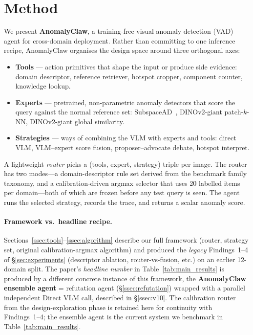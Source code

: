 \section{Method}
\label{sec:method}

We present \textbf{AnomalyClaw}, a training-free visual anomaly detection (VAD) agent for cross-domain deployment. Rather than committing to one inference recipe, AnomalyClaw organises the design space around three orthogonal axes:

\begin{itemize}
    \item \textbf{Tools} --- action primitives that shape the input or produce side evidence: domain descriptor, reference retriever, hotspot cropper, component counter, knowledge lookup.
    \item \textbf{Experts} --- pretrained, non-parametric anomaly detectors that score the query against the normal reference set: SubspaceAD~\citep{subspacead2026}, DINOv2-giant patch-$k$-NN, DINOv2-giant global similarity.
    \item \textbf{Strategies} --- ways of combining the VLM with experts and tools: direct VLM, VLM--expert score fusion, proposer--advocate debate, hotspot interpret.
\end{itemize}

A lightweight \emph{router} picks a (tools, expert, strategy) triple per image. The router has two modes---a domain-descriptor rule set derived from the benchmark family taxonomy, and a calibration-driven argmax selector that uses 20 labelled items per domain---both of which are frozen before any test query is seen. The agent runs the selected strategy, records the trace, and returns a scalar anomaly score.

\paragraph{Framework vs.\ headline recipe.}
Sections~\ref{ssec:tools}--\ref{ssec:algorithm} describe our full
framework (router, strategy set, original calibration-argmax algorithm)
and produced the \emph{legacy} Findings~1--4 of \S\ref{sec:experiments}
(descriptor ablation, router-vs-fusion, etc.) on an earlier 12-domain
split. The paper's \emph{headline number} in Table~\ref{tab:main_results}
is produced by a different concrete instance of this framework, the
\textbf{AnomalyClaw ensemble agent} = refutation agent (\S\ref{ssec:refutation})
wrapped with a parallel independent Direct VLM call, described in
\S\ref{ssec:v10}. The calibration router from the design-exploration
phase is retained here for continuity with Findings~1--4; the ensemble
agent is the current system we benchmark in Table~\ref{tab:main_results}.

